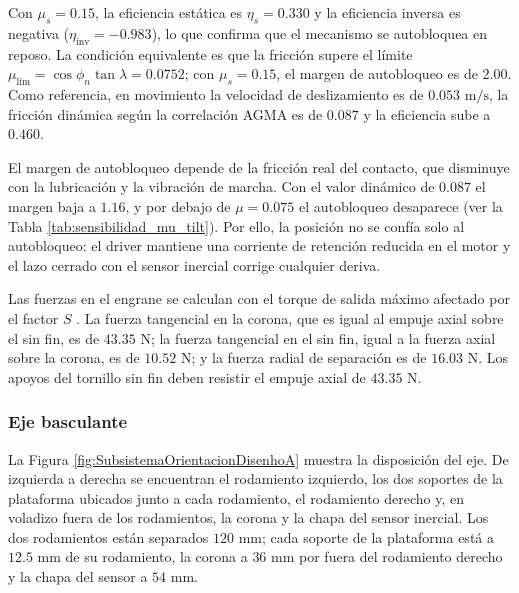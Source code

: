 \documentclass[../../General.tex]{subfiles}
\begin{document}
Con $\mu_s = 0.15$, la eficiencia estática es $\eta_s = 0.330$ y la eficiencia inversa es negativa ($\eta_{\text{inv}} = -0.983$), lo que confirma que el mecanismo se autobloquea en reposo. La condición equivalente es que la fricción supere el límite $\mu_{\text{lím}} = \cos\phi_n \tan\lambda = 0.0752$; con $\mu_s = 0.15$, el margen de autobloqueo es de $2.00$. Como referencia, en movimiento la velocidad de deslizamiento es de $0.053\text{ m/s}$, la fricción dinámica según la correlación AGMA es de $0.087$ y la eficiencia sube a $0.460$.

El margen de autobloqueo depende de la fricción real del contacto, que disminuye con la lubricación y la vibración de marcha. Con el valor dinámico de $0.087$ el margen baja a $1.16$, y por debajo de $\mu = 0.075$ el autobloqueo desaparece (ver la Tabla \ref{tab:sensibilidad_mu_tilt}). Por ello, la posición no se confía solo al autobloqueo: el driver mantiene una corriente de retención reducida en el motor y el lazo cerrado con el sensor inercial corrige cualquier deriva.

Las fuerzas en el engrane se calculan con el torque de salida máximo afectado por el factor $S$ \citep{shigley2012mecanico}. La fuerza tangencial en la corona, que es igual al empuje axial sobre el sin fin, es de $43.35\text{ N}$; la fuerza tangencial en el sin fin, igual a la fuerza axial sobre la corona, es de $10.52\text{ N}$; y la fuerza radial de separación es de $16.03\text{ N}$. Los apoyos del tornillo sin fin deben resistir el empuje axial de $43.35\text{ N}$.

\subsubsection{Eje basculante}

La Figura \ref{fig:SubsistemaOrientacionDisenhoA} muestra la disposición del eje. De izquierda a derecha se encuentran el rodamiento izquierdo, los dos soportes de la plataforma ubicados junto a cada rodamiento, el rodamiento derecho y, en voladizo fuera de los rodamientos, la corona y la chapa del sensor inercial. Los dos rodamientos están separados $120\text{ mm}$; cada soporte de la plataforma está a $12.5\text{ mm}$ de su rodamiento, la corona a $36\text{ mm}$ por fuera del rodamiento derecho y la chapa del sensor a $54\text{ mm}$.
\end{document}
